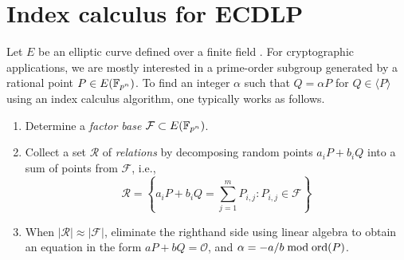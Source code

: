 %
%

\section{Index calculus for ECDLP}
%
\label{sec:index-calculus-ecdlp}
%
Let $E$ be an elliptic curve defined over a finite field .
%
For cryptographic applications, we are mostly interested in a
prime-order subgroup generated by a rational point $P\in E(\mathbb F_{p^n})$.
%
To find an integer $\alpha$ such that $Q=\alpha P$ for
$Q\in\langle P\rangle$ using an index calculus algorithm, one
typically works as follows.
%
\begin{enumerate}
%
\item Determine a \emph{factor base} $\mathcal F\subset E(\mathbb F_{p^n})$.
%
\item Collect a set $\mathcal R$ of \emph{relations} by decomposing
  random points $a_iP+b_iQ$ into a sum of points from $\mathcal F$,
  i.e.,
  \[ \mathcal
    R=\left\{a_iP+b_iQ=\sum_{j=1}^mP_{i,j}:P_{i,j}\in\mathcal
      F\right\} \]
%
\item When $|\mathcal R|\approx|\mathcal F|$, eliminate the righthand
  side using linear algebra to obtain an equation in the form
  $aP+bQ=\mathcal O$, and $\alpha=-a/b\bmod\operatorname{ord}(P)$.
%
\end{enumerate} 

